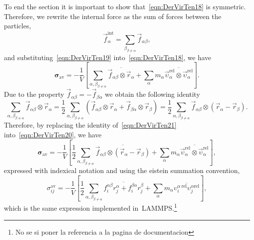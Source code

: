 To end the section it is important to show that~\eqref{eqn:DerVirTen18} is symmetric.
Therefore, we rewrite the internal force as the sum of forces between the particles,
\begin{equation}
    \vec{f}^{\mathrm{int}}_\alpha = \sum_{{\beta}_{\beta\neq\alpha}}\vec{f}_{\alpha\beta}\label{eqn:DerVirTen19},
\end{equation}
and substituting~\eqref{eqn:DerVirTen19} into~\eqref{eqn:DerVirTen18}, we have
\begin{equation}
    \bm{\sigma}_{\mathrm{av}}
    =
    -\frac{1}{V}
    \left[
        \sum_{{\alpha,\beta}_{\beta\neq\alpha}}\overline{\vec{f}_{\alpha\beta}\otimes\vec{r}_\alpha}
        +
        \sum_\alpha m_\alpha\overline{\vec{\upsilon}_\alpha^{\mathrm{rel}}\otimes\vec{\upsilon}_\alpha^{\mathrm{rel}}}
    \right].\label{eqn:DerVirTen20}
\end{equation}
Due to the property $\vec{f}_{\alpha\beta}=-\vec{f}_{\beta\alpha}$ we obtain the following identity
\begin{equation}
    \sum_{{\alpha,\beta}_{\beta\neq\alpha}}\vec{f}_{\alpha\beta}\otimes\vec{r}_\alpha 
    =
    \frac{1}{2}\sum_{{\alpha,\beta}_{\beta\neq\alpha}}\left(\vec{f}_{\alpha\beta}\otimes\vec{r}_\alpha+\vec{f}_{\beta\alpha}\otimes\vec{r}_\beta\right)
    =
    \frac{1}{2}\sum_{{\alpha,\beta}_{\beta\neq\alpha}}\vec{f}_{\alpha\beta}\otimes\left(\vec{r}_\alpha-\vec{r}_\beta\right).\label{eqn:DerVirTen21}
\end{equation}
Therefore, by replacing the identity of~\eqref{eqn:DerVirTen21} into~\eqref{eqn:DerVirTen20}, we have
\begin{equation}
    \bm{\sigma}_{\mathrm{av}}
    =
    -\frac{1}{V}
    \left[
        \frac{1}{2}
        \sum_{{\alpha,\beta}_{\beta\neq\alpha}}\overline{\vec{f}_{\alpha\beta}\otimes\left(\vec{r}_\alpha-\vec{r}_\beta\right)}
        +
        \sum_\alpha m_\alpha\overline{\vec{\upsilon}_\alpha^{\mathrm{rel}}\otimes\vec{\upsilon}_\alpha^{\mathrm{rel}}}
    \right],\label{eqn:DerVirTen22}
\end{equation}
expressed with indexical notation and using the eistein summation convention,
\begin{equation}
    \sigma^{\mathrm{av}}_{ij}
    =
    -\frac{1}{V}
    \left[
        \frac{1}{2}
        \sum_{{\alpha,\beta}_{\beta\neq\alpha}}\overline{f^{\alpha\beta}_{i}r^\alpha_{j} + f^{\beta\alpha}_{i}r^\beta_{j}}
        +
        \sum_\alpha m_\alpha\overline{\upsilon^{\alpha~\mathrm{rel}}_{i}\upsilon^{\alpha{\mathrm{rel}}}_j}
    \right],\label{eqn:DerVirTen23}
\end{equation}
which is the same expression implemented in~LAMMPS\citep{LAMMPS}.\footnote{No se si poner la referencia a la pagina de documentacion}%

